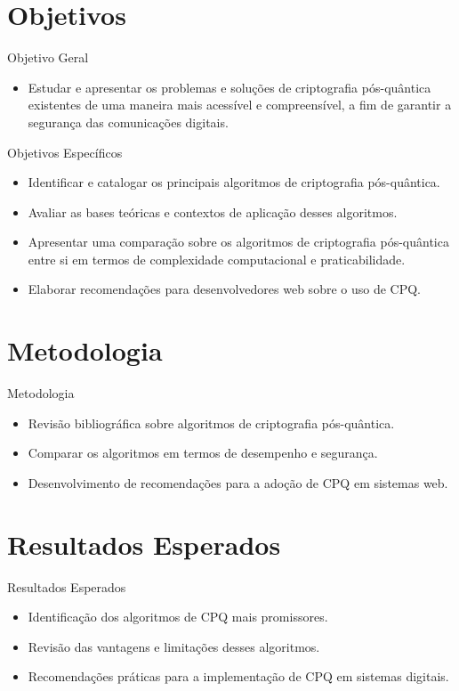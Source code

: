 \documentclass[aspectratio=169]{beamer}
\begin{document}
	\section{Objetivos}
	\begin{frame}{Objetivo Geral}
		\begin{itemize}
			\item Estudar e apresentar os problemas e soluções de criptografia pós-quântica existentes de uma maneira mais acessível e compreensível, a fim de garantir a segurança das comunicações digitais.
		\end{itemize}
	\end{frame}
	
	\begin{frame}{Objetivos Específicos}
		\begin{itemize}
			\item Identificar e catalogar os principais algoritmos de criptografia       pós-quântica.
			\item Avaliar as bases teóricas e contextos de aplicação desses             algoritmos.
                \item Apresentar uma comparação sobre os algoritmos de criptografia pós-quântica entre si em termos de complexidade computacional e praticabilidade.
			\item Elaborar recomendações para desenvolvedores web sobre o uso de CPQ.
		\end{itemize}
	\end{frame}
	
	\section{Metodologia}
	\begin{frame}{Metodologia}
		\begin{itemize}
			\item Revisão bibliográfica sobre algoritmos de criptografia pós-quântica.
			\item Comparar os algoritmos em termos de desempenho e segurança.
			\item Desenvolvimento de recomendações para a adoção de CPQ em sistemas web.
		\end{itemize}
	\end{frame}
	
	\section{Resultados Esperados}
	\begin{frame}{Resultados Esperados}
		\begin{itemize}
			\item Identificação dos algoritmos de CPQ mais promissores.
			\item Revisão das vantagens e limitações desses algoritmos.
			\item Recomendações práticas para a implementação de CPQ em sistemas digitais.
		\end{itemize}
	\end{frame}
\end{document}
